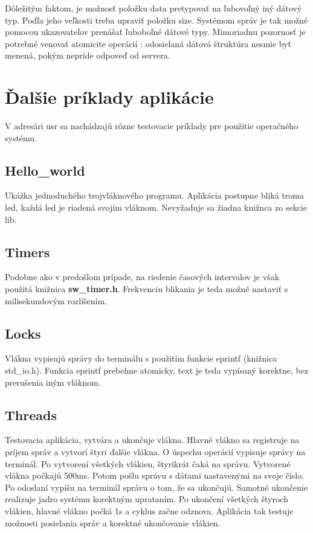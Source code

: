 Dôležitým faktom, je možnosť položku data pretypovať na ľubovoľný iný dátový typ. Podľa jeho veľkosti treba upraviť položku size. Systémom správ je tak možné pomocou ukazovateľov prenášať ľuboboľné dátové typy. Mimoriadnu pozornosť je potrebné venovať atomicite operácií : odosielaná dátová štruktúra nesmie byť menená, pokým nepríde odpoveď od servera.


\section{Ďalšie príklady aplikácie}

V adresári usr sa nachádzajú rôzne testovacie príklady pre použitie operačného systému.

\subsection{Hello\_world}
Ukážka jednoduchého trojvláknového programu. Aplikácia postupne bliká troma led, každá led je riadená svojím vláknom. Nevyžaduje sa žiadna knižnca zo sekcie lib.

\subsection{Timers}
Podobne ako v predošlom prípade, na riedenie časových intervalov je však použitá knižnica \textbf{sw\_timer.h}. Frekvenciu blikania je teda možné nastaviť s milisekundovým rozlíšením.

\subsection{Locks}
Vlákna vypisujú správy do terminálu s použitím funkcie eprintf (knižnica std\_io.h). Funkcia eprintf prebehne atomicky, text je teda vypísaný korektne, bez prerušenia iným vláknom.

\subsection{Threads}
Testovacia aplikácia, vytvára a ukončuje vlákna. Hlavné vlákno sa registruje na príjem správ a vytvorí štyri ďalšie vlákna. O úspechu operácií vypisuje správy na terminál. Po vytvorení všetkých vlákien, štyrikrát čaká na správu. Vytvorené vlákna počkajú 500ms. Potom pošlu správu s dátami nastavenými na svoje číslo. Po odoslaní vypíšu na terminál správu o tom, že sa ukončujú. Samotné ukončenie realizuje jadro systému korektným uprataním. Po ukončení všetkých štyroch vlákien, hlavné vlákno počká 1s a cyklus začne odznova. Aplikácia tak testuje možnosti posielania správ a korektné ukončovanie vlákien.

